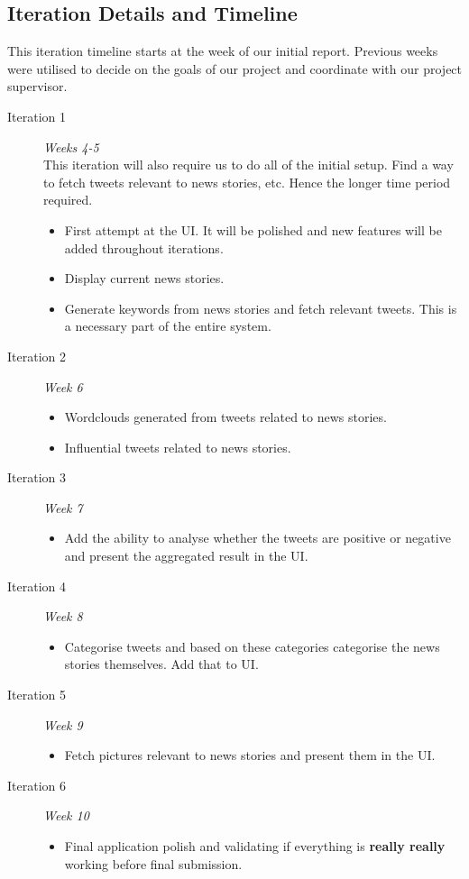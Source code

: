 \documentclass[a4paper,12pt]{article}
\begin{document}
  \subsection{Iteration Details and Timeline}
  This iteration timeline starts at the week of our initial report. Previous weeks were utilised to decide on the goals of our project and coordinate with our project supervisor.
  \begin{description}
   \item[Iteration 1] \emph{Weeks 4-5}\\
   This iteration will also require us to do all of the initial setup. Find a way to fetch tweets relevant to news stories, etc. Hence the longer time period required.
   \begin{itemize}
     \item First attempt at the UI. It will be polished and new features will be added throughout iterations.
     \item Display current news stories.
     \item Generate keywords from news stories and fetch relevant tweets. This is a necessary part of the entire system.
   \end{itemize}
   \item[Iteration 2] \emph{Week 6}
   \begin{itemize}
     \item Wordclouds generated from tweets related to news stories.
     \item Influential tweets related to news stories.
   \end{itemize}
   \item[Iteration 3] \emph{Week 7}
   \begin{itemize}
     \item Add the ability to analyse whether the tweets are positive or negative and present the aggregated result in the UI.
   \end{itemize}
   \item[Iteration 4] \emph{Week 8}
   \begin{itemize}
     \item Categorise tweets and based on these categories categorise the news stories themselves. Add that to UI.
   \end{itemize}
   \item[Iteration 5] \emph{Week 9}
   \begin{itemize}
     \item Fetch pictures relevant to news stories and present them in the UI.
   \end{itemize}
   \item[Iteration 6] \emph{Week 10}
   \begin{itemize}
     \item Final application polish and validating if everything is \textbf{really really} working before final submission.
   \end{itemize}
  \end{description}
	
\end{document}
